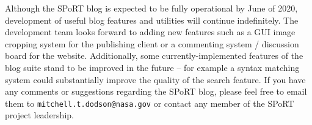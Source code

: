 \documentclass[12pt]{article}
\begin{document}
Although the SPoRT blog is expected to be fully operational by June of 2020, development of useful blog features and utilities will continue indefinitely. The development team looks forward to adding new features such as a GUI image cropping system for the publishing client or a commenting system / discussion board for the website. Additionally, some currently-implemented features of the blog suite stand to be improved in the future -- for example a syntax matching system could substantially improve the quality of the search feature. If you have any comments or suggestions regarding the SPoRT blog, please feel free to email them to \texttt{mitchell.t.dodson@nasa.gov} or contact any member of the SPoRT project leadership.

\nocite{Brooke18}
\nocite{Melbourne15}
\nocite{Ceta20}
\nocite{blender19}

\newpage
\printbibliography
\end{document}
